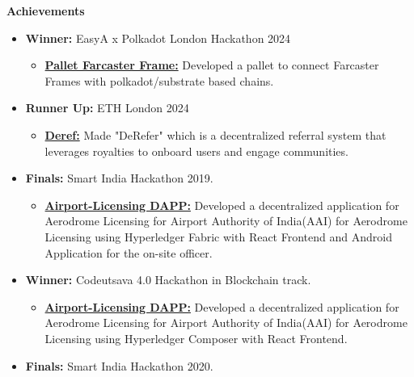 \documentclass{article}
\begin{document}
\noindent \large \textbf{\textcolor{NavyBlue}{Achievements}}
\begin{itemize}[noitemsep,nolistsep,leftmargin=*]
    \item { \normalsize \textbf{Winner:} EasyA x Polkadot London Hackathon 2024
        \begin{itemize}
            \item \normalsize \href{https://github.com/Shritesh99/pallet-farcaster_frame}{\textbf{Pallet Farcaster Frame:}} Developed a pallet to connect Farcaster Frames with polkadot/substrate based chains.
        \end{itemize}
    }
    \item { \normalsize \textbf{Runner Up:} ETH London 2024
        \begin{itemize}
            \item \normalsize \href{https://github.com/Shritesh99/deref}{\textbf{Deref:}}  Made "DeRefer" which is a decentralized referral system that leverages royalties to onboard users and engage communities.
        \end{itemize}
    }
    \item { \normalsize \textbf{Finals:} Smart India Hackathon 2019. 
        \begin{itemize}
            \item \normalsize \href{https://github.com/Shritesh99/airport}{\textbf{Airport-Licensing DAPP:}} Developed a decentralized application for Aerodrome Licensing for Airport Authority of India(AAI) for Aerodrome Licensing using Hyperledger Fabric with React Frontend and Android Application for the on-site officer.
        \end{itemize}
    }
    \item { \normalsize \textbf{Winner:} Codeutsava 4.0 Hackathon in Blockchain track.
        \begin{itemize}
            \item \normalsize \href{https://github.com/Shritesh99/airport}{\textbf{Airport-Licensing DAPP:}} Developed a decentralized application for Aerodrome Licensing for Airport Authority of India(AAI) for Aerodrome Licensing using Hyperledger Composer with React Frontend.
        \end{itemize}
    }
    \item { \normalsize \textbf{Finals:} Smart India Hackathon 2020. 
}
\end{itemize}
\end{document}
